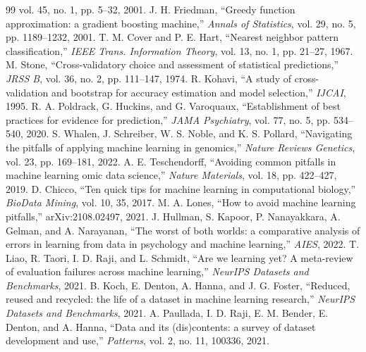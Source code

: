 \documentclass[10pt,twocolumn]{article}
\begin{document}
{\begin{thebibliography}{99}
vol. 45, no. 1, pp. 5--32, 2001.
 J. H. Friedman, ``Greedy function approximation: a
gradient boosting machine,'' \emph{Annals of Statistics}, vol. 29, no. 5,
pp. 1189--1232, 2001.
 T. M. Cover and P. E. Hart, ``Nearest neighbor pattern
classification,'' \emph{IEEE Trans. Information Theory}, vol. 13, no. 1,
pp. 21--27, 1967.
 M. Stone, ``Cross-validatory choice and assessment of
statistical predictions,'' \emph{JRSS B}, vol. 36, no. 2, pp. 111--147, 1974.
 R. Kohavi, ``A study of cross-validation and bootstrap for
accuracy estimation and model selection,'' \emph{IJCAI}, 1995.
 R. A. Poldrack, G. Huckins, and G. Varoquaux,
``Establishment of best practices for evidence for prediction,'' \emph{JAMA
Psychiatry}, vol. 77, no. 5, pp. 534--540, 2020.
 S. Whalen, J. Schreiber, W. S. Noble, and K. S. Pollard,
``Navigating the pitfalls of applying machine learning in genomics,''
\emph{Nature Reviews Genetics}, vol. 23, pp. 169--181, 2022.
 A. E. Teschendorff, ``Avoiding common pitfalls in
machine learning omic data science,'' \emph{Nature Materials}, vol. 18,
pp. 422--427, 2019.
 D. Chicco, ``Ten quick tips for machine learning in
computational biology,'' \emph{BioData Mining}, vol. 10, 35, 2017.
 M. A. Lones, ``How to avoid machine learning pitfalls,''
arXiv:2108.02497, 2021.
 J. Hullman, S. Kapoor, P. Nanayakkara, A. Gelman, and
A. Narayanan, ``The worst of both worlds: a comparative analysis of errors in
learning from data in psychology and machine learning,'' \emph{AIES}, 2022.
 T. Liao, R. Taori, I. D. Raji, and L. Schmidt, ``Are we
learning yet? A meta-review of evaluation failures across machine learning,''
\emph{NeurIPS Datasets and Benchmarks}, 2021.
 B. Koch, E. Denton, A. Hanna, and J. G. Foster, ``Reduced,
reused and recycled: the life of a dataset in machine learning research,''
\emph{NeurIPS Datasets and Benchmarks}, 2021.
 A. Paullada, I. D. Raji, E. M. Bender, E. Denton, and
A. Hanna, ``Data and its (dis)contents: a survey of dataset development and use,''
\emph{Patterns}, vol. 2, no. 11, 100336, 2021.
\end{thebibliography}
}
\end{document}
